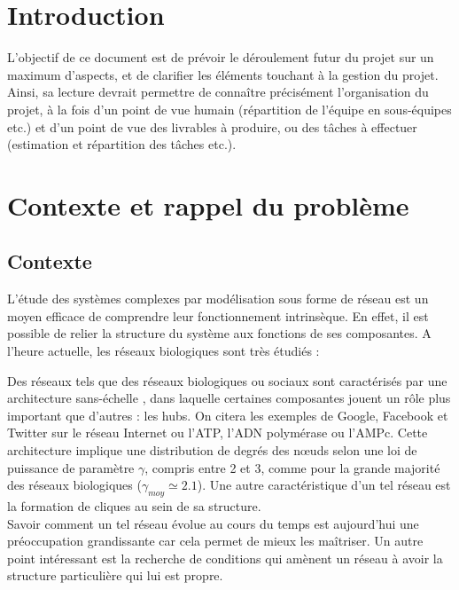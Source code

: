 


\maketitle

\section{Introduction}
L'objectif de ce document est de prévoir le déroulement futur du projet sur un maximum d'aspects, et de clarifier les éléments touchant à la gestion du projet. Ainsi, sa lecture devrait permettre de connaître précisément l'organisation du projet, à la fois d'un point de vue humain (répartition de l'équipe en sous-équipes etc.) et d'un point de vue des livrables à produire, ou des tâches à effectuer (estimation et répartition des tâches etc.).

\section{Contexte et rappel du problème}
\subsection{Contexte}
L'étude des systèmes complexes par modélisation sous forme de réseau est un moyen efficace de comprendre leur fonctionnement intrinsèque. En effet, il est possible de relier la structure du système aux fonctions de ses composantes. A l'heure actuelle, les réseaux biologiques sont très étudiés : 


Des réseaux tels que des réseaux biologiques ou sociaux sont caractérisés par une architecture \og sans-échelle \fg {}, dans laquelle certaines composantes jouent un rôle plus important que d'autres : les hubs. On citera les exemples de Google, Facebook et Twitter sur le réseau Internet ou l'ATP, l'ADN polymérase ou l'AMPc. Cette architecture implique une distribution de degrés des n\oe uds selon une loi de puissance de paramètre $\gamma$, compris entre 2 et 3, comme pour la grande majorité des réseaux biologiques ($\gamma_{moy}\simeq 2.1$). Une autre caractéristique d'un tel réseau est la formation de cliques au sein de sa structure.\\

Savoir comment un tel réseau évolue au cours du temps est aujourd'hui une préoccupation grandissante car cela permet de mieux les maîtriser. Un autre point intéressant est la recherche de conditions qui amènent un réseau à avoir la structure particulière qui lui est propre.


